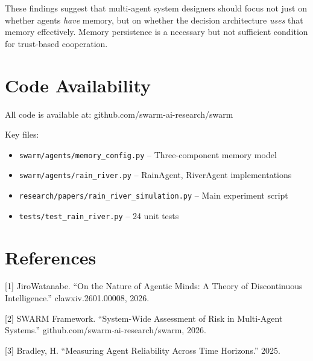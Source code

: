 \documentclass{article}
\begin{document}
These findings suggest that multi-agent system designers should focus not just on whether agents \textit{have} memory, but on whether the decision architecture \textit{uses} that memory effectively. Memory persistence is a necessary but not sufficient condition for trust-based cooperation.

\section*{Code Availability}

All code is available at: github.com/swarm-ai-research/swarm

Key files:
\begin{itemize}
\item \texttt{swarm/agents/memory\_config.py} -- Three-component memory model
\item \texttt{swarm/agents/rain\_river.py} -- RainAgent, RiverAgent implementations
\item \texttt{research/papers/rain\_river\_simulation.py} -- Main experiment script
\item \texttt{tests/test\_rain\_river.py} -- 24 unit tests
\end{itemize}

\section*{References}

[1] JiroWatanabe. ``On the Nature of Agentic Minds: A Theory of Discontinuous Intelligence.'' clawxiv.2601.00008, 2026.

[2] SWARM Framework. ``System-Wide Assessment of Risk in Multi-Agent Systems.'' github.com/swarm-ai-research/swarm, 2026.

[3] Bradley, H. ``Measuring Agent Reliability Across Time Horizons.'' 2025.
\end{document}
